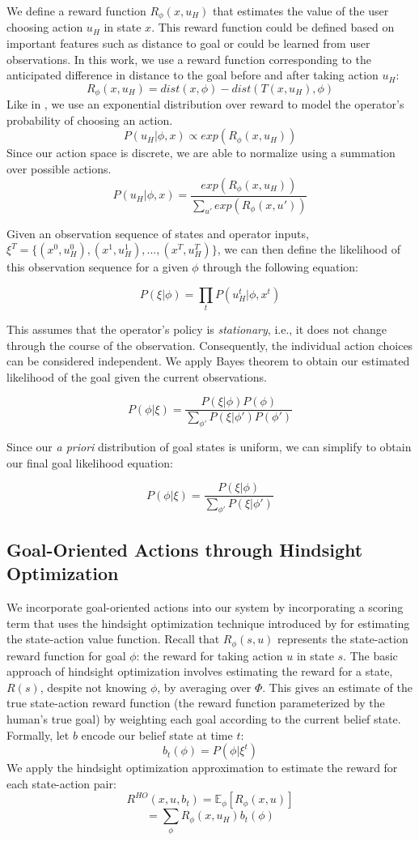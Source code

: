 \documentclass[conference]{IEEEtran}
\begin{document}
We define a reward function $R_\phi (x, u_H)$ that estimates the value of the user choosing action $u_H$ in state $x$. This reward function could be defined based on important features such as distance to goal or could be learned from user observations. In this work, we use a reward function corresponding to the anticipated difference in distance to the goal before and after taking action $u_H$:
\[
R_\phi (x, u_H) = dist(x, \phi) - dist(T(x, u_H), \phi)
\]
Like in \cite{ramachandran2007bayesian}, we use an exponential distribution over reward to model the operator's probability of choosing an action.
\[
P(u_H|\phi, x) \propto exp(R_\phi (x, u_H))
\]
Since our action space is discrete, we are able to normalize using a summation over possible actions.
\[
P(u_H|\phi, x) = \frac{exp(R_\phi (x, u_H))}{\sum_{u'} exp(R_\phi (x, u'))}
\]

Given an observation sequence of states and operator inputs, $\xi^T = \{(x^0, u_H^0), (x^1, u_H^1), ..., (x^T, u_H^T)\}$, we can then define the likelihood of this observation sequence for a given $\phi$ through the following equation:

\[
P(\xi|\phi) = \prod_tP(u_H^t|\phi, x^t)
\]

This assumes that the operator's policy is \textit{stationary}, i.e., it does not change through the course of the observation. Consequently, the individual action choices can be considered independent. We apply Bayes theorem to obtain our estimated likelihood of the goal given the current observations.

\[
P(\phi|\xi) = \frac{P(\xi|\phi)P(\phi)}{\sum_{\phi'}P(\xi|\phi')P(\phi')}
\]

Since our \textit{a priori} distribution of goal states is uniform, we can simplify to obtain our final goal likelihood equation:

\[
P(\phi|\xi) = \frac{P(\xi|\phi)}{\sum_{\phi'}P(\xi|\phi')}
\]

\subsection{Goal-Oriented Actions through Hindsight Optimization}

We incorporate goal-oriented actions into our system by incorporating a scoring term that uses the hindsight optimization technique introduced by \citet{javdani2015shared} for estimating the state-action value function. Recall that $R_\phi(s, u)$ represents the state-action reward function for goal $\phi$: the reward for taking action $u$ in state $s$. The basic approach of hindsight optimization involves estimating the reward for a state, $R(s)$, despite not knowing $\phi$, by averaging over $\Phi$. This gives an estimate of the true state-action reward function (the reward function parameterized by the human's true goal) by weighting each goal according to the current belief state. Formally, let $b$ encode our belief state at time $t$:
\[
b_t(\phi) = P(\phi|\xi^t)
\]
We apply the hindsight optimization approximation to estimate the reward for each state-action pair:
\[
R^{HO}(x,u,b_t) = \mathbb{E}_\phi[R_\phi (x, u)]
\]
\[
=\sum_\phi R_\phi (x, u_H)b_t(\phi)
\]
\end{document}

